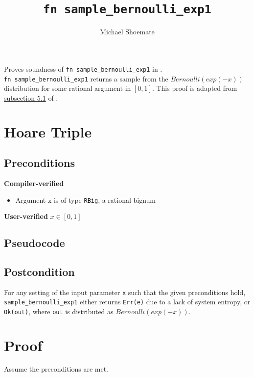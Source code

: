 \documentclass{article}
\title{\texttt{fn sample\_bernoulli\_exp1}}
\author{Michael Shoemate}
\begin{document}
 
\maketitle 
 
Proves soundness of \texttt{fn sample\_bernoulli\_exp1} in .\\ 
\texttt{fn sample\_bernoulli\_exp1} returns a sample from the $Bernoulli(exp(-x))$ distribution for some rational argument in $[0, 1]$. 
This proof is adapted from \href{https://arxiv.org/pdf/2004.00010.pdf#subsection.5.1}{subsection 5.1} of \cite{CKS20}. 
 
\section{Hoare Triple} 
\subsection*{Preconditions} 
 
\textbf{Compiler-verified} 
\begin{itemize} 
    \item Argument $\texttt{x}$ is of type \texttt{RBig}, a rational bignum 
\end{itemize} 
 
\textbf{User-verified} 
$x \in [0, 1]$ 
 
 
\subsection*{Pseudocode}         
 
 
\subsection*{Postcondition} 
\begin{theorem}
\label{postcondition} 
For any setting of the input parameter \texttt{x} such that the given preconditions hold, \\ 
\texttt{sample\_bernoulli\_exp1} either returns \texttt{Err(e)} due to a lack of system entropy, 
or \texttt{Ok(out)}, where \texttt{out} is distributed as $Bernoulli(exp(-x))$. 
\end{theorem}
 
\section{Proof} 
Assume the preconditions are met. 
 
\end{document}
